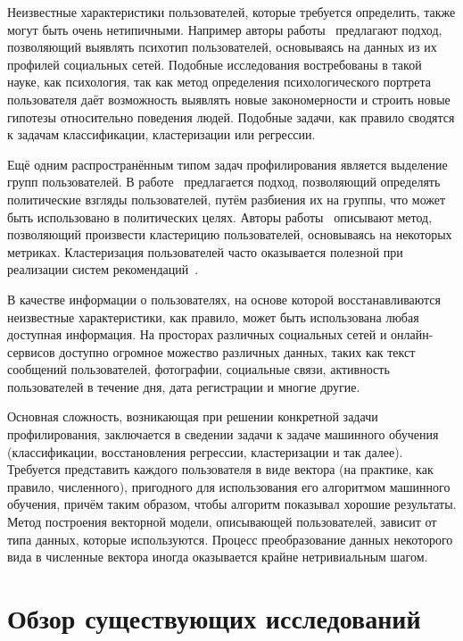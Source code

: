 Неизвестные характеристики пользователей, которые требуется
определить, также могут быть очень нетипичными. Например
авторы работы~\cite{schwartz2013personality} предлагают
подход, позволяющий выявлять психотип пользователей, основываясь
на данных из их профилей социальных сетей. Подобные исследования
востребованы в такой науке, как психология, так как метод
определения психологического портрета пользователя даёт
возможность выявлять новые закономерности и строить новые
гипотезы относительно поведения людей. Подобные задачи,
как правило сводятся к задачам классификации, кластеризации
или регрессии.

Ещё одним распространённым типом задач профилирования является
выделение групп пользователей. В работе~\cite{barbera2015tweeting}
предлагается подход, позволяющий определять политические взгляды
пользователей, путём разбиения их на группы, что может быть
использовано в политических целях. Авторы 
работы~\cite{maia2008identifying} описывают метод, позволяющий
произвести кластерицию пользователей, основываясь на некоторых
метриках. Кластеризация пользователей часто оказывается полезной
при реализации систем рекомендаций~\cite{sarwar2002recommender}.

В качестве информации о пользователях, на основе которой
восстанавливаются неизвестные характеристики, как правило,
может быть использована любая доступная информация. На просторах
различных социальных сетей и онлайн-сервисов доступно огромное
можество различных данных, таких как текст сообщений пользователей,
фотографии, социальные связи, активность пользователей в течение
дня, дата регистрации и многие другие.

Основная сложность, возникающая при решении конкретной задачи
профилирования, заключается в сведении задачи к задаче машинного
обучения (классификации, восстановления регрессии, кластеризации и
так далее). Требуется представить каждого пользователя в
виде вектора (на практике, как правило, численного), пригодного для
использования его алгоритмом машинного обучения, причём таким образом,
чтобы алгоритм показывал хорошие результаты. Метод построения векторной
модели, описывающей пользователей, зависит от типа данных,
которые используются. Процесс преобразование данных некоторого вида в
численные вектора иногда оказывается крайне нетривиальным шагом.

\section{Обзор существующих исследований}
\label{sec:previous_work}

